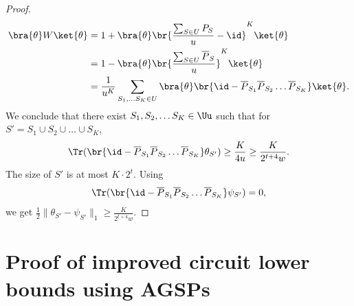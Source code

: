 \documentclass{toc}
\begin{document}
\begin{proof}
\begin{align}
\bra{\theta}W\ket{\theta}&= 1+\bra{\theta}\br{\frac{\sum_{S\in U}P_S}{u}-\id}^K\ket{\theta}\\
&=1-\bra{\theta}\br{\frac{\sum_{S\in U}\overline{P}_S}{u}}^K\ket{\theta}\\
&=\frac{1}{u^K}\sum_{S_1, \ldots S_K\in U}\bra{\theta}\br{\id-\overline{P}_{S_1}\overline{P}_{S_2}\ldots \overline{P}_{S_K}}\ket{\theta}.
\end{align}
 We conclude that there exist $S_1,S_2, \ldots S_K\in \Uu$ such that for $S' =  S_1 \cup S_2 \cup \ldots \cup S_K$,
\begin{align}\Tr(\br{\id-\overline{P}_{S_1}\overline{P}_{S_2}\ldots \overline{P}_{S_K}}\theta_{S'}) \geq \frac{K}{4u}\geq \frac{K}{2^{t+4}w}.
\end{align}
The size of $S'$ is at most $K\cdot 2^t$.
Using 
\begin{align}\Tr(\br{\id-\overline{P}_{S_1}\overline{P}_{S_2}\ldots \overline{P}_{S_K}}\psi_{S'})=0,
\end{align} we get $\frac{1}{2}\|\theta_{S'}-\psi_{S'}\|_1\geq \frac{K}{2^{t+4}w}$.
\end{proof}


\section{Proof of improved circuit lower bounds using AGSPs}
\label{sec:appendix-pf}
\end{document}
